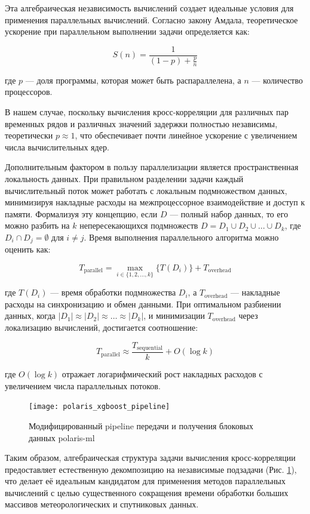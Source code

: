 Эта алгебраическая независимость вычислений создает идеальные условия для
применения параллельных вычислений. Согласно закону Амдала, теоретическое
ускорение при параллельном выполнении задачи определяется как:

\[
	S(n) = \frac{1}{(1-p) + \frac{p}{n}}
\]

где $p$ — доля программы, которая может быть распараллелена, а $n$ — количество процессоров.

В нашем случае, поскольку вычисления кросс-корреляции для различных пар
временных рядов и различных значений задержки полностью независимы, теоретически
$p \approx 1$, что обеспечивает почти линейное ускорение с увеличением числа
вычислительных ядер.

Дополнительным фактором в пользу параллелизации является пространственная
локальность данных. При правильном разделении задачи каждый вычислительный поток
может работать с локальным подмножеством данных, минимизируя накладные расходы
на межпроцессорное взаимодействие и доступ к памяти. Формализуя эту концепцию,
если $D$ — полный набор данных, то его можно разбить на $k$ непересекающихся
подмножеств $D = D_1 \cup D_2 \cup \ldots \cup D_k$, где $D_i \cap D_j =
	\emptyset$ для $i \neq j$. Время выполнения параллельного алгоритма можно
оценить как:

\[
	T_{\text{parallel}} = \max_{i \in \{1, 2, \ldots, k\}} \{T(D_i)\} + T_{\text{overhead}}
\]

где $T(D_i)$ — время обработки подмножества $D_i$, а $T_{\text{overhead}}$ —
накладные расходы на синхронизацию и обмен данными. При оптимальном разбиении
данных, когда $|D_1| \approx |D_2| \approx \ldots \approx |D_k|$, и минимизации
$T_{\text{overhead}}$ через локализацию вычислений, достигается соотношение:

\[
	T_{\text{parallel}} \approx \frac{T_{\text{sequential}}}{k} + O(\log k)
\]

где $O(\log k)$ отражает логарифмический рост накладных расходов с увеличением
числа параллельных потоков.

\begin{figure}[H]
	\centering
	\texttt{[image: polaris\_xgboost\_pipeline]}
	~\caption{Модифицированный pipeline передачи и получения блоковых данных polaris-ml}
	\label{fig:polaris_xgboost_pipeline}
\end{figure}

Таким образом, алгебраическая структура задачи вычисления кросс-корреляции
предоставляет естественную декомпозицию на независимые подзадачи (Рис. \ref{fig:polaris_xgboost_pipeline}), что делает её
идеальным кандидатом для применения методов параллельных вычислений с целью
существенного сокращения времени обработки больших массивов метеорологических и
спутниковых данных.

